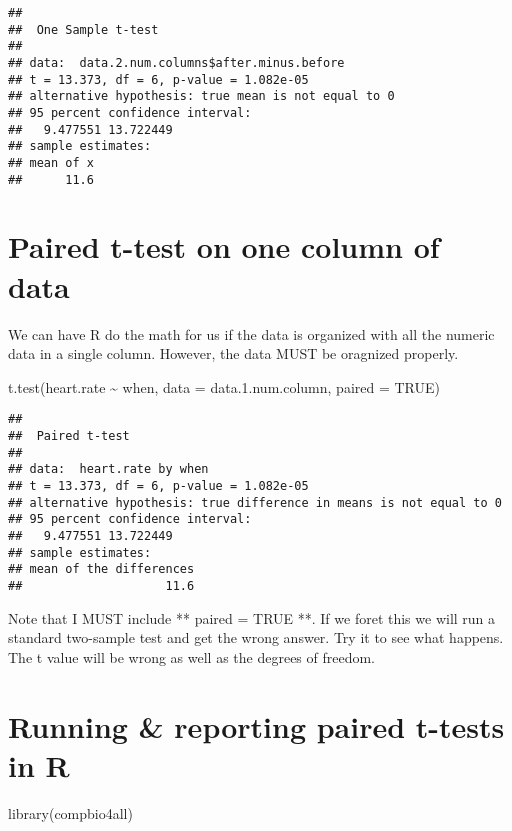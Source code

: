 \documentclass[
]{book}
\newenvironment{Shaded}{\begin{snugshade}}{\end{snugshade}}
\newcommand{\AttributeTok}[1]{\textcolor[rgb]{0.77,0.63,0.00}{#1}}
\newcommand{\ConstantTok}[1]{\textcolor[rgb]{0.00,0.00,0.00}{#1}}
\newcommand{\FloatTok}[1]{\textcolor[rgb]{0.00,0.00,0.81}{#1}}
\newcommand{\FunctionTok}[1]{\textcolor[rgb]{0.00,0.00,0.00}{#1}}
\newcommand{\NormalTok}[1]{#1}
\newcommand{\SpecialCharTok}[1]{\textcolor[rgb]{0.00,0.00,0.00}{#1}}
\begin{document}
\begin{verbatim}
## 
##  One Sample t-test
## 
## data:  data.2.num.columns$after.minus.before
## t = 13.373, df = 6, p-value = 1.082e-05
## alternative hypothesis: true mean is not equal to 0
## 95 percent confidence interval:
##   9.477551 13.722449
## sample estimates:
## mean of x 
##      11.6
\end{verbatim}

\hypertarget{paired-t-test-on-one-column-of-data}{%
\chapter{Paired t-test on one column of data}\label{paired-t-test-on-one-column-of-data}}

We can have R do the math for us if the data is organized with all the numeric data in a single column. However, the data MUST be oragnized properly.

\begin{Shaded}
\begin{Highlighting}[]
\FunctionTok{t.test}\NormalTok{(heart.rate }\SpecialCharTok{\textasciitilde{}}\NormalTok{ when, }
       \AttributeTok{data =}\NormalTok{ data.}\FloatTok{1.}\NormalTok{num.column,}
       \AttributeTok{paired =} \ConstantTok{TRUE}\NormalTok{)}
\end{Highlighting}
\end{Shaded}

\begin{verbatim}
## 
##  Paired t-test
## 
## data:  heart.rate by when
## t = 13.373, df = 6, p-value = 1.082e-05
## alternative hypothesis: true difference in means is not equal to 0
## 95 percent confidence interval:
##   9.477551 13.722449
## sample estimates:
## mean of the differences 
##                    11.6
\end{verbatim}

Note that I MUST include ** paired = TRUE **. If we foret this we will run a standard two-sample test and get the wrong answer. Try it to see what happens. The t value will be wrong as well as the degrees of freedom.

\hypertarget{running-reporting-paired-t-tests-in-r}{%
\chapter{Running \& reporting paired t-tests in R}\label{running-reporting-paired-t-tests-in-r}}

\begin{Shaded}
\begin{Highlighting}[]
\FunctionTok{library}\NormalTok{(compbio4all)}
\end{Highlighting}
\end{Shaded}
\end{document}
